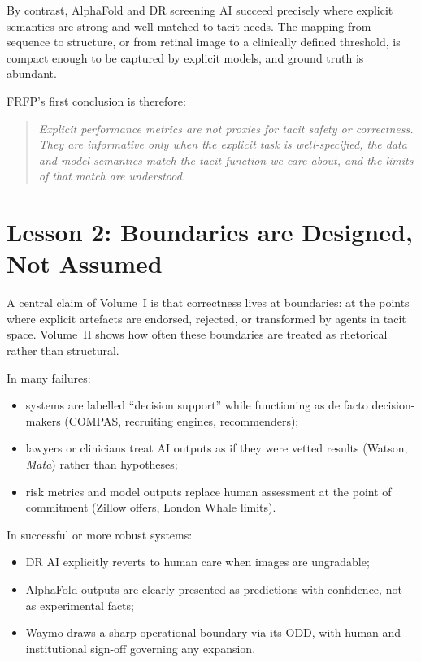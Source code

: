 By contrast, AlphaFold and DR screening AI succeed precisely where explicit semantics are strong and well-matched to tacit needs.
The mapping from sequence to structure, or from retinal image to a clinically defined threshold, is compact enough to be captured by explicit models, and ground truth is abundant.

FRFP’s first conclusion is therefore:

\begin{quote}
  \emph{Explicit performance metrics are not proxies for tacit safety or correctness.
  They are informative only when the explicit task is well-specified, the data and model semantics match the tacit function we care about, and the limits of that match are understood.}
\end{quote}

\section*{Lesson 2: Boundaries are Designed, Not Assumed}

A central claim of Volume~I is that correctness lives at boundaries:
at the points where explicit artefacts are endorsed, rejected, or transformed by agents in tacit space.
Volume~II shows how often these boundaries are treated as rhetorical rather than structural.

In many failures:

\begin{itemize}
  \item systems are labelled ``decision support'' while functioning as de facto decision-makers (COMPAS, recruiting engines, recommenders);
  \item lawyers or clinicians treat AI outputs as if they were vetted results (Watson, \emph{Mata}) rather than hypotheses;
  \item risk metrics and model outputs replace human assessment at the point of commitment (Zillow offers, London Whale limits).
\end{itemize}

In successful or more robust systems:

\begin{itemize}
  \item DR AI explicitly reverts to human care when images are ungradable;
  \item AlphaFold outputs are clearly presented as predictions with confidence, not as experimental facts;
  \item Waymo draws a sharp operational boundary via its ODD, with human and institutional sign-off governing any expansion.
\end{itemize}

